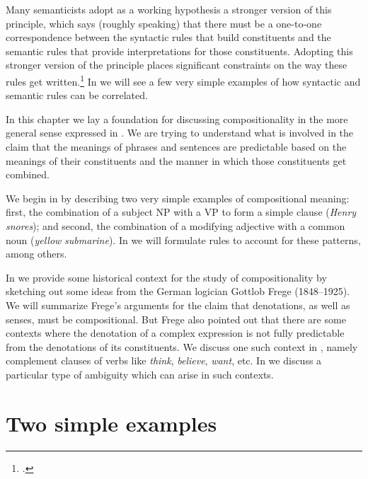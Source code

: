 Many semanticists adopt as a working hypothesis a stronger version of this principle, which says (roughly speaking) that there must be a one-to-one correspondence between the syntactic rules that build constituents and the semantic rules that provide interpretations for those constituents. Adopting this stronger version of the principle places significant constraints on the way these rules get written.\footnote{\citet[322]{Partee1995}.} In  we will see a few very simple examples of how syntactic and semantic rules can be correlated.



In this chapter we lay a foundation for discussing compositionality in the more general sense expressed in . We are trying to understand what is involved in the claim that the meanings of phrases and sentences are predictable based on the meanings of their constituents and the manner in which those constituents get combined.



We begin in  by describing two very simple examples of compositional meaning: first, the combination of a subject NP with a VP to form a simple clause (\textit{Henry snores}); and second, the combination of a modifying adjective with a common noun (\textit{yellow} \textit{submarine}). In  we will formulate rules to account for these patterns, among others.



In  we provide some historical context for the study of compositionality by sketching out some ideas from the German logician Gottlob Frege (1848–1925). We will summarize Frege’s arguments for the claim that denotations, as well as senses, must be compositional. But Frege also pointed out that there are some contexts where the denotation of a complex expression is not fully predictable from the denotations of its constituents. We discuss one such context in , namely complement clauses of verbs like \textit{think}, \textit{believe}, \textit{want}, etc. In  we discuss a particular type of ambiguity which can arise in such contexts.


\section{Two simple examples}\label{sec:12.2}

